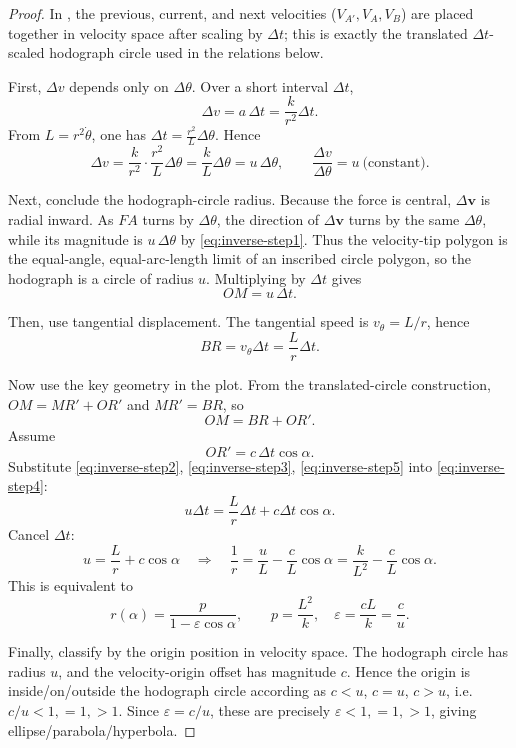 \begin{proof}
In , the previous, current, and next velocities ($V_{A'},V_A,V_B$) are placed together in velocity space after scaling by $\Delta t$; this is exactly the translated $\Delta t$-scaled hodograph circle used in the relations below.

First, $\Delta v$ depends only on $\Delta\theta$.
Over a short interval $\Delta t$,
\[
  \Delta v=a\,\Delta t=\frac{k}{r^2}\Delta t.
\]
From $L=r^2\dot\theta$, one has $\Delta t=\frac{r^2}{L}\Delta\theta$. Hence
\begin{equation}
  \Delta v=\frac{k}{r^2}\cdot\frac{r^2}{L}\Delta\theta=\frac{k}{L}\Delta\theta=u\,\Delta\theta,
  \qquad
  \frac{\Delta v}{\Delta\theta}=u\ \text{(constant)}.
\label{eq:inverse-step1}
\end{equation}

Next, conclude the hodograph-circle radius.
Because the force is central, $\Delta\mathbf v$ is radial inward. As $FA$ turns by $\Delta\theta$, the direction of $\Delta\mathbf v$ turns by the same $\Delta\theta$, while its magnitude is $u\,\Delta\theta$ by \eqref{eq:inverse-step1}. Thus the velocity-tip polygon is the equal-angle, equal-arc-length limit of an inscribed circle polygon, so the hodograph is a circle of radius $u$. Multiplying by $\Delta t$ gives
\begin{equation}
  OM=u\,\Delta t.
\label{eq:inverse-step2}
\end{equation}

Then, use tangential displacement.
The tangential speed is $v_\theta=L/r$, hence
\begin{equation}
  BR=v_\theta\Delta t=\frac{L}{r}\Delta t.
\label{eq:inverse-step3}
\end{equation}

Now use the key geometry in the plot.
From the translated-circle construction, $OM=MR'+OR'$ and $MR'=BR$, so
\begin{equation}
  OM=BR+OR'.
\label{eq:inverse-step4}
\end{equation}
Assume
\begin{equation}
  OR'=c\,\Delta t\cos\alpha.
\label{eq:inverse-step5}
\end{equation}
Substitute \eqref{eq:inverse-step2}, \eqref{eq:inverse-step3}, \eqref{eq:inverse-step5} into \eqref{eq:inverse-step4}:
\[
  u\Delta t=\frac{L}{r}\Delta t+c\Delta t\cos\alpha.
\]
Cancel $\Delta t$:
\[
  u=\frac{L}{r}+c\cos\alpha
  \quad\Longrightarrow\quad
  \frac1r=\frac{u}{L}-\frac{c}{L}\cos\alpha
  =\frac{k}{L^2}-\frac{c}{L}\cos\alpha.
\]
This is equivalent to
\[
  r(\alpha)=\frac{p}{1-\varepsilon\cos\alpha},
  \qquad
  p=\frac{L^2}{k},
  \quad
  \varepsilon=\frac{cL}{k}=\frac{c}{u}.
\]

Finally, classify by the origin position in velocity space.
The hodograph circle has radius $u$, and the velocity-origin offset has magnitude $c$. Hence the origin is inside/on/outside the hodograph circle according as $c<u$, $c=u$, $c>u$, i.e. $c/u<1,=1,>1$. Since $\varepsilon=c/u$, these are precisely $\varepsilon<1,=1,>1$, giving ellipse/parabola/hyperbola.
\end{proof}
